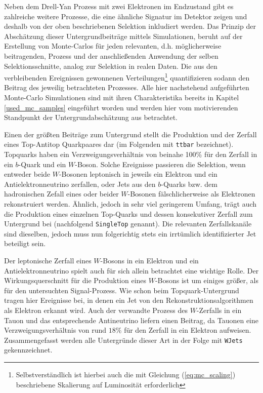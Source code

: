 
Neben dem Drell-Yan Prozess mit zwei Elektronen im Endzustand gibt es
zahlreiche weitere Prozesse, die eine ähnliche Signatur im Detektor zeigen und
deshalb von der oben beschriebenen Selektion inkludiert werden. Das Prinzip der
Abschätzung dieser Untergrundbeiträge mittels Simulationen, beruht auf der
Erstellung von Monte-Carlos für jeden relevanten, d.h. möglicherweise
beitragenden, Prozess und der anschließenden Anwendung der selben
Selektionsschnitte, analog zur Selektion in realen Daten. Die aus den
verbleibenden Ereignissen gewonnenen Verteilungen\footnote{Selbstverständlich
ist hierbei auch die mit Gleichung (\ref{eq:mc_scaling}) beschriebene
Skalierung auf Luminosität erforderlich} quantifizieren sodann den Beitrag des
jeweilig betrachteten Prozesses. Alle hier nachstehend aufgeführten Monte-Carlo
Simulationen sind mit ihren Charakteristika bereits in Kapitel
\ref{used_mc_samples} eingeführt worden und werden hier vom motivierenden
Standpunkt der Untergrundabschätzung aus betrachtet.

Einen der größten Beiträge zum Untergrund stellt die Produktion und der Zerfall
eines Top-Antitop Quarkpaares dar (im Folgenden mit \texttt{ttbar} bezeichnet).
Topquarks haben ein Verzweigungsverhältnis von beinahe 100\% für den Zerfall in
ein $b$-Quark und ein $W$-Boson. Solche Ereignisse passieren die Selektion,
wenn entweder beide $W$-Bosonen leptonisch in jeweils ein Elektron und ein
Antielektronneutrino zerfallen, oder Jets aus den $b$-Quarks bzw. dem
hadronischen Zefall eines oder beider $W$-Bosonen fälschlicherweise als
Elektronen rekonstruiert werden. Ähnlich, jedoch in sehr viel geringerem
Umfang, trägt auch die Produktion eines einzelnen Top-Quarks und dessen
konsekutiver Zerfall zum Untergrund bei (nachfolgend \texttt{SingleTop}
genannt). Die relevanten Zerfallskanäle sind dieselben, jedoch muss nun
folgerichtig stets ein irrtümlich identifizierter Jet beteiligt sein.

Der leptonische Zerfall eines $W$-Bosons in ein Elektron und ein
Antielektronneutrino spielt auch für sich allein betrachtet eine wichtige
Rolle. Der Wirkungsquerschnitt für die Produktion eines $W$-Bosons ist um
einiges größer, als für den untersuchten Signal-Prozess. Wie schon beim
Topquark-Untergrund tragen hier Ereignisse bei, in denen ein Jet von den
Rekonstruktionsalgorithmen als Elektron erkannt wird. Auch der verwandte
Prozess des $W$-Zerfalls in ein Tauon und das entsprechende Antineutrino
liefern einen Beitrag, da Tauonen eine Verzweigungsverhältnis von rund $18\%$
für den Zerfall in ein Elektron aufweisen. Zusammengefasst werden alle
Untergründe dieser Art in der Folge mit \texttt{WJets} gekennzeichnet.

